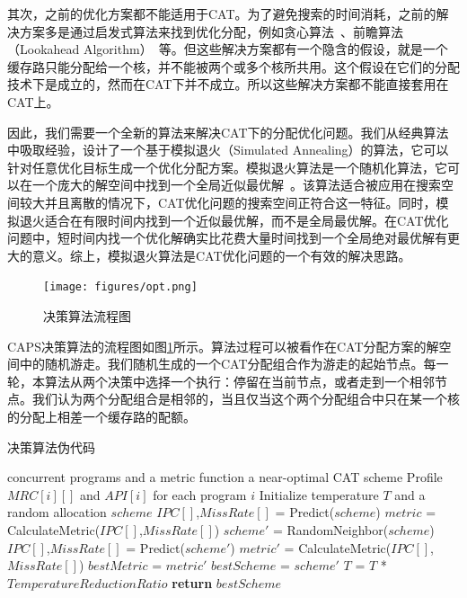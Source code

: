 其次，之前的优化方案都不能适用于CAT。为了避免搜索的时间消耗，之前的解决方案多是通过启发式算法来找到优化分配，例如贪心算法~\parencite{suh2004dynamic}、前瞻算法（Lookahead Algorithm）~\parencite{qureshi2006utility}等。但这些解决方案都有一个隐含的假设，就是一个缓存路只能分配给一个核，并不能被两个或多个核所共用。这个假设在它们的分配技术下是成立的，然而在CAT下并不成立。所以这些解决方案都不能直接套用在CAT上。

因此，我们需要一个全新的算法来解决CAT下的分配优化问题。我们从经典算法中吸取经验，设计了一个基于模拟退火（Simulated Annealing）的算法，它可以针对任意优化目标生成一个优化分配方案。模拟退火算法是一个随机化算法，它可以在一个庞大的解空间中找到一个全局近似最优解~\parencite{aarts1988simulated,hwang1988simulated}。该算法适合被应用在搜索空间较大并且离散的情况下，CAT优化问题的搜索空间正符合这一特征。同时，模拟退火适合在有限时间内找到一个近似最优解，而不是全局最优解。在CAT优化问题中，短时间内找一个优化解确实比花费大量时间找到一个全局绝对最优解有更大的意义。综上，模拟退火算法是CAT优化问题的一个有效的解决思路。

\begin{figure}[htbp] 
    \centering
    \texttt{[image: figures/opt.png]}
    \caption{决策算法流程图}
    \label{fig:opt}
\end{figure}

CAPS决策算法的流程图如图\ref{fig:opt}所示。算法过程可以被看作在CAT分配方案的解空间中的随机游走。我们随机生成的一个CAT分配组合作为游走的起始节点。每一轮，本算法从两个决策中选择一个执行：停留在当前节点，或者走到一个相邻节点。我们认为两个分配组合是相邻的，当且仅当这个两个分配组合中只在某一个核的分配上相差一个缓存路的配额。

\begin{algorithm}
\caption{决策算法伪代码}
\label{alg:opt}
\begin{algorithmic}[1]
\renewcommand{\algorithmicforall}{\textbf{foreach}}
\renewcommand{\algorithmicrequire}{\textbf{Input:}}
\renewcommand{\algorithmicensure}{\textbf{Output:}}
\REQUIRE concurrent programs and a metric function
\ENSURE a near-optimal CAT scheme
\STATE Profile $MRC[i][]$ and $API[i]$ for each program $i$
\STATE Initialize temperature $T$ and a random allocation $scheme$
\STATE $IPC[]$,$MissRate[]$ = Predict($scheme$)
\STATE $metric$ = CalculateMetric($IPC[]$,$MissRate[]$)
	\STATE $scheme'$ = RandomNeighbor($scheme$)
    \STATE $IPC[]$,$MissRate[]$ = Predict($scheme'$)
    \STATE $metric'$ = CalculateMetric($IPC[]$,$MissRate[]$)
    	\STATE $bestMetric$ = $metric'$ 
        \STATE $bestScheme$ = $scheme'$
    \ENDIF
    \ELSE
    \ENDIF
    \ENDIF
    \STATE $T$ = $T$ * $TemperatureReductionRatio$
\ENDWHILE
\STATE \textbf{return} $bestScheme$

\end{algorithmic}
\end{algorithm}

